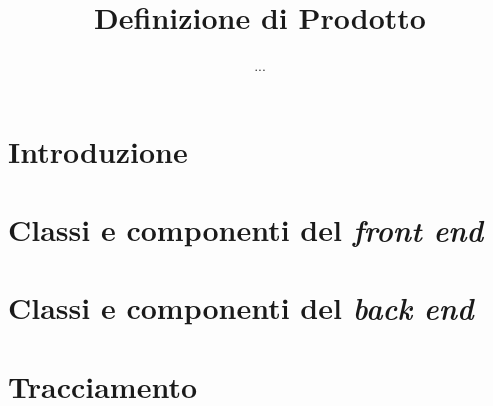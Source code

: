 


\author{...}
\dest{\ALL}
\title{Definizione di Prodotto}

\newcommand{\nogloxy}[1]{#1}
\newcommand{\subsubsubsection}[1]{\paragraph{#1}}
\newcommand{\textt}[1]{\texttt{#1}}


\maketitle

\tableofcontents



\section{Introduzione}


\section{Classi e componenti del \emph{front end}}


\section{Classi e componenti del \emph{back end}}


\section{Tracciamento}




